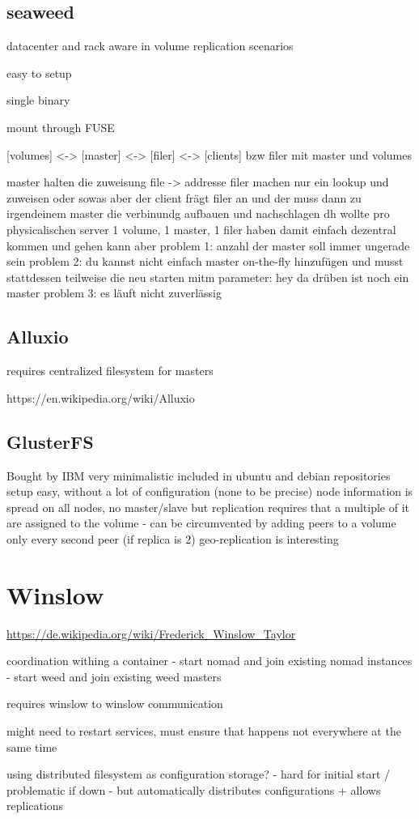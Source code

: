 \subsection{seaweed}

datacenter and rack aware in volume replication scenarios

easy to setup

single binary

mount through FUSE


[volumes] <-> [master] <-> [filer] <-> [clients]
bzw filer mit master und volumes

master halten die zuweisung file -> addresse
filer machen nur ein lookup und zuweisen oder sowas
aber der client frägt filer an
und der muss dann zu irgendeinem master die verbinundg aufbauen und nachschlagen
dh wollte pro physicalischen server 1 volume, 1 master, 1 filer haben
damit einfach dezentral kommen und gehen kann
aber problem 1: anzahl der master soll immer ungerade sein
problem 2: du kannst nicht einfach master on-the-fly hinzufügen und musst stattdessen teilweise die neu starten mitm parameter: hey da drüben ist noch ein master
problem 3: es läuft nicht zuverlässig

\subsection{Alluxio}

requires centralized filesystem for masters

https://en.wikipedia.org/wiki/Alluxio

\subsection{GlusterFS}

Bought by IBM
very minimalistic
included in ubuntu and debian repositories
setup easy, without a lot of configuration (none to be precise)
node information is spread on all nodes, no master/slave
but replication requires that a multiple of it are assigned to the volume - can be circumvented by adding peers to a volume only every second peer (if replica is 2)
geo-replication is interesting

\section{Winslow}
\url{https://de.wikipedia.org/wiki/Frederick_Winslow_Taylor}

coordination withing a container
 - start nomad and join existing nomad instances
 - start weed and join existing weed masters
 
requires winslow to winslow communication

might need to restart services, must ensure that happens not everywhere at the same time

using distributed filesystem as configuration storage?
 - hard for initial start / problematic if down
 - but automatically distributes configurations + allows replications